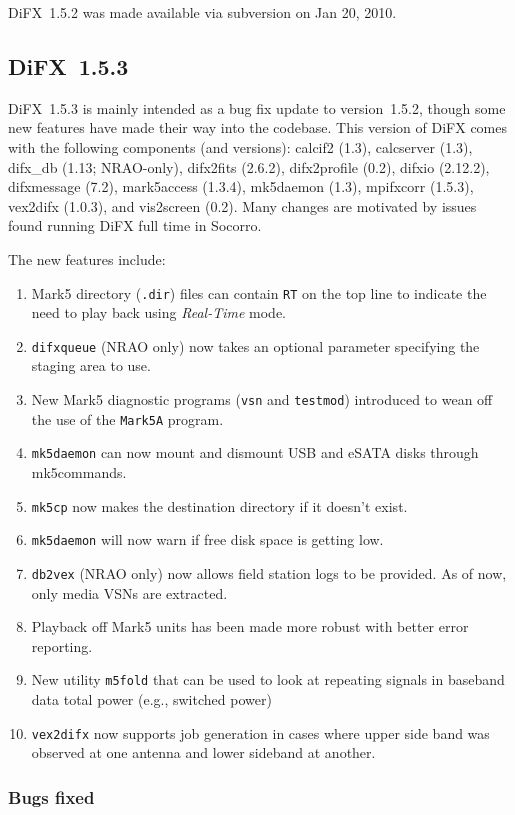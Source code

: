 DiFX~1.5.2 was made available via subversion on Jan 20, 2010.

\subsection{DiFX~1.5.3}

DiFX~1.5.3 is mainly intended as a bug fix update to version~1.5.2, though some new features have made their way into the codebase.
This version of DiFX comes with the following components (and versions): calcif2 (1.3), calcserver (1.3), difx\_db (1.13; NRAO-only), difx2fits (2.6.2), difx2profile (0.2), difxio (2.12.2), difxmessage (7.2), mark5access (1.3.4), mk5daemon (1.3), mpifxcorr (1.5.3), vex2difx (1.0.3), and vis2screen (0.2).
Many changes are motivated by issues found running DiFX full time in Socorro.

The new features include:
\begin{enumerate}
\item Mark5 directory ({\tt .dir}) files can contain {\tt RT} on the top line to indicate the need to play back using {\em Real-Time} mode.
\item {\tt difxqueue} (NRAO only) now takes an optional parameter specifying the staging area to use.
\item New Mark5 diagnostic programs ({\tt vsn} and {\tt testmod}) introduced to wean off the use of the {\tt Mark5A} program.
\item {\tt mk5daemon} can now mount and dismount USB and eSATA disks through mk5commands.
\item {\tt mk5cp} now makes the destination directory if it doesn't exist.
\item {\tt mk5daemon} will now warn if free disk space is getting low.
\item {\tt db2vex} (NRAO only) now allows field station logs to be provided.  As of now, only media VSNs are extracted.
\item Playback off Mark5 units has been made more robust with better error reporting.
\item New utility {\tt m5fold} that can be used to look at repeating signals in baseband data total power (e.g., switched power)
\item {\tt vex2difx} now supports job generation in cases where upper side band was observed at one antenna and lower sideband at another.
\end{enumerate}

\subsubsection{Bugs fixed}

